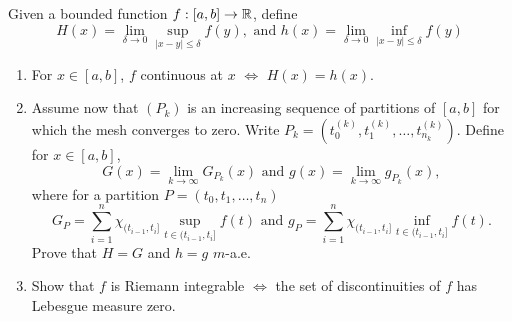 \documentclass{article}
\begin{document}
 Given a bounded function $f : [a,b] \to \mathbb{R}$, define
$$ H(x) = \lim_{\delta \to 0} \sup_{|x - y| \le \delta} f(y), \text{ and } h(x) = \lim_{\delta \to 0} \inf_{|x - y| \le \delta} f(y)$$
\begin{enumerate}[\bfseries a)]
\item For $x \in [a,b]$, $f$ continuous at $x$ $\iff$ $H(x) = h(x)$.
\item Assume now that $(P_k)$ is an increasing sequence of partitions of $[a,b]$ for which the mesh converges to zero. Write $P_k = (t_0^{(k)}, t_1^{(k)}, \ldots, t_{n_k}^{(k)})$. Define for $x \in [a,b]$,
$$G(x) = \lim_{k \to \infty} G_{P_k}(x) \text{ and } g(x) = \lim_{k \to \infty} g_{P_k}(x),$$
where for a partition $P = (t_0, t_1, \ldots, t_n)$
$$G_P = \sum_{i=1}^n \chi_{(t_{i-1}, t_i]} \sup_{t \in (t_{i-1}, t_i]} f(t) \text{ and } g_P = \sum_{i=1}^n \chi_{(t_{i-1}, t_i]} \inf_{t \in (t_{i-1}, t_i]} f(t).$$
Prove that $H = G$ and $h = g$ $m$-a.e.
\item Show that $f$ is Riemann integrable $\iff$ the set of discontinuities of $f$ has Lebesgue measure zero.
\end{enumerate}
\end{document}
